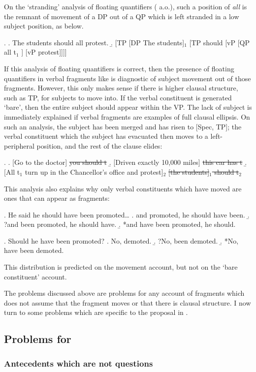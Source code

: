 \documentclass[doublespace]{umthesis}
\begin{document}
On the `stranding' analysis of floating quantifiers (\cite{Sp88} a.o.), such a position of {\it all} is the remnant of movement of a DP out of a QP which is left stranded in a low subject position, as below.

\exi. 	\a. The students should all protest.
	\b. [TP [DP The students]$_1$ [TP should [vP [QP all t$_1$ ] [vP protest]]]]
	
If this analysis of floating quantifiers is correct, then the presence of floating quantifiers in verbal fragments like \Last is diagnostic of subject movement out of those fragments. However, this only makes sense if there is higher clausal structure, such as TP, for subjects to move into. If the verbal constituent is generated `bare', then the entire subject should appear within the VP. The lack of subject is immediately explained if verbal fragments are examples of full clausal ellipsis. On such an analysis, the subject has been merged and has risen to [Spec, TP]; the verbal constituent which the subject has evacuated then moves to a left-peripheral position, and the rest of the clause elides:

\ex. 	\a. [Go to the doctor] \sout{you should t}
	\b. [Driven exactly 10,000 miles] \sout{this car has t}
	\b. [All t$_1$ turn up in the Chancellor's office and protest]$_2$ \sout{[the students]$_1$ should t$_2$}
	
This analysis also explains why only verbal constituents which have moved are ones that can appear as fragments:

\ex. 	He said he should have been promoted\ldots
	\a. and promoted, he should have been.
	\b. ?and been promoted, he should have.
	\b. *and have been promoted, he should.
	
\ex. 	Should he have been promoted?
	\a. No, demoted.
	\b. ?No, been demoted.
	\b. *No, have been demoted.
	
This distribution is predicted on the movement account, but not on the `bare constituent' account.

The problems discussed above are problems for any account of fragments which does not assume that the fragment moves or that there is clausal structure. I now turn to some problems which are specific to the proposal in \cite{Ja13}.

\subsection{Problems for \cite{Ja13}}

\subsubsection{Antecedents which are not questions}\label{sec-antecedents-which-are-not-questions}
\end{document}
